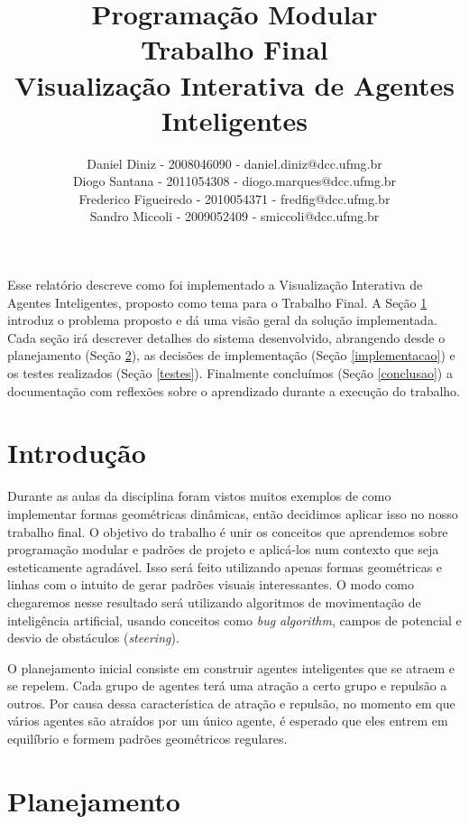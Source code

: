 \documentclass[12pt]{article}
\title{Programação Modular \\ Trabalho Final \\ Visualização Interativa de Agentes Inteligentes}
\author{Daniel Diniz - 2008046090 - daniel.diniz@dcc.ufmg.br\\
		Diogo Santana - 2011054308 - diogo.marques@dcc.ufmg.br\\
		Frederico Figueiredo - 2010054371 - fredfig@dcc.ufmg.br\\
		Sandro Miccoli - 2009052409 - smiccoli@dcc.ufmg.br}
\begin{document}
\maketitle


\begin{resumo}

Esse relatório descreve como foi implementado a Visualização Interativa de Agentes Inteligentes, proposto como tema para o Trabalho Final. A Seção \ref{introducao} introduz o problema proposto e dá uma visão geral da solução implementada. Cada seção irá descrever detalhes do sistema desenvolvido, abrangendo desde o planejamento (Seção \ref{planejamento}), as decisões de implementação (Seção \ref{implementacao}) e os testes realizados (Seção \ref{testes}). Finalmente concluímos (Seção \ref{conclusao}) a documentação com reflexões sobre o aprendizado durante a execução do trabalho.

\end{resumo}

\section{Introdução}
\label{introducao}


Durante as aulas da disciplina foram vistos muitos exemplos de como implementar formas geométricas dinâmicas, então decidimos aplicar isso no nosso trabalho final. O objetivo do trabalho é unir os conceitos que aprendemos sobre programação modular e padrões de projeto e aplicá-los num contexto que seja esteticamente agradável. Isso será feito utilizando apenas formas geométricas e linhas com o intuito de gerar padrões visuais interessantes.
O modo como chegaremos nesse resultado será utilizando algoritmos de movimentação de inteligência artificial, usando conceitos como \textit{bug algorithm}, campos de potencial e desvio de obstáculos (\textit{steering}).

O planejamento inicial consiste em construir agentes inteligentes que se atraem e se repelem. Cada grupo de agentes terá uma atração a certo grupo e repulsão a outros. Por causa dessa característica de atração e repulsão, no momento em que vários agentes são atraídos por um único agente, é esperado que eles entrem em equilíbrio e formem padrões geométricos regulares.

\section{Planejamento}
\label{planejamento}
\end{document}
